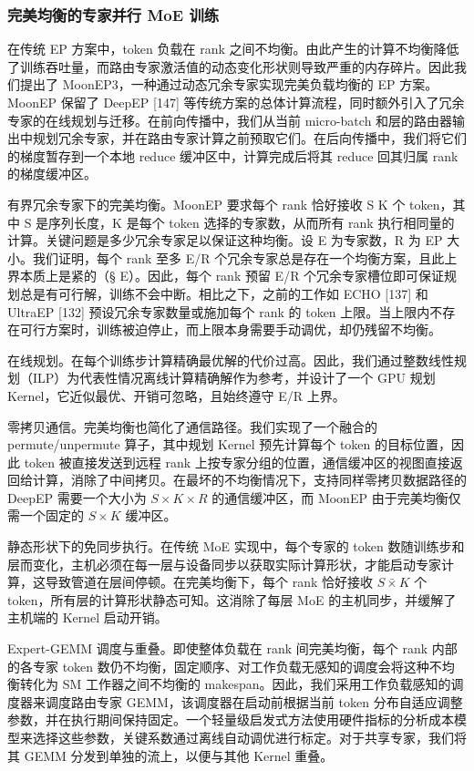 \subsubsection{完美均衡的专家并行 MoE 训练}\label{perfectly-balanced-expert-parallel-moe-training}

在传统 EP 方案中，token 负载在 rank 之间不均衡。由此产生的计算不均衡降低了训练吞吐量，而路由专家激活值的动态变化形状则导致严重的内存碎片。因此我们提出了 MoonEP3，一种通过动态冗余专家实现完美负载均衡的 EP 方案。MoonEP 保留了 DeepEP {[}147{]} 等传统方案的总体计算流程，同时额外引入了冗余专家的在线规划与迁移。在前向传播中，我们从当前 micro-batch 和层的路由器输出中规划冗余专家，并在路由专家计算之前预取它们。在后向传播中，我们将它们的梯度暂存到一个本地 reduce 缓冲区中，计算完成后将其 reduce 回其归属 rank 的梯度缓冲区。

有界冗余专家下的完美均衡。MoonEP 要求每个 rank 恰好接收 S K 个 token，其中 S 是序列长度，K 是每个 token 选择的专家数，从而所有 rank 执行相同量的计算。关键问题是多少冗余专家足以保证这种均衡。设 E 为专家数，R 为 EP 大小。我们证明，每个 rank 至多 E/R 个冗余专家总是存在一个均衡方案，且此上界本质上是紧的（§ E）。因此，每个 rank 预留 E/R 个冗余专家槽位即可保证规划总是有可行解，训练不会中断。相比之下，之前的工作如 ECHO {[}137{]} 和 UltraEP {[}132{]} 预设冗余专家数量或施加每个 rank 的 token 上限。当上限内不存在可行方案时，训练被迫停止，而上限本身需要手动调优，却仍残留不均衡。

在线规划。在每个训练步计算精确最优解的代价过高。因此，我们通过整数线性规划（ILP）为代表性情况离线计算精确解作为参考，并设计了一个 GPU 规划 Kernel，它近似最优、开销可忽略，且始终遵守 E/R 上界。

零拷贝通信。完美均衡也简化了通信路径。我们实现了一个融合的 permute/unpermute 算子，其中规划 Kernel 预先计算每个 token 的目标位置，因此 token 被直接发送到远程 rank 上按专家分组的位置，通信缓冲区的视图直接返回给计算，消除了中间拷贝。在最坏的不均衡情况下，支持同样零拷贝数据路径的 DeepEP 需要一个大小为 \(S \times K \times R\) 的通信缓冲区，而 MoonEP 由于完美均衡仅需一个固定的 \(S \times K\) 缓冲区。

静态形状下的免同步执行。在传统 MoE 实现中，每个专家的 token 数随训练步和层而变化，主机必须在每一层与设备同步以获取实际计算形状，才能启动专家计算，这导致管道在层间停顿。在完美均衡下，每个 rank 恰好接收 \(S \bar { \times } K\) 个 token，所有层的计算形状静态可知。这消除了每层 MoE 的主机同步，并缓解了主机端的 Kernel 启动开销。

Expert-GEMM 调度与重叠。即使整体负载在 rank 间完美均衡，每个 rank 内部的各专家 token 数仍不均衡，固定顺序、对工作负载无感知的调度会将这种不均衡转化为 SM 工作器之间不均衡的 makespan。因此，我们采用工作负载感知的调度器来调度路由专家 GEMM，该调度器在启动前根据当前 token 分布自适应调整参数，并在执行期间保持固定。一个轻量级启发式方法使用硬件指标的分析成本模型来选择这些参数，关键系数通过离线自动调优进行标定。对于共享专家，我们将其 GEMM 分发到单独的流上，以便与其他 Kernel 重叠。

